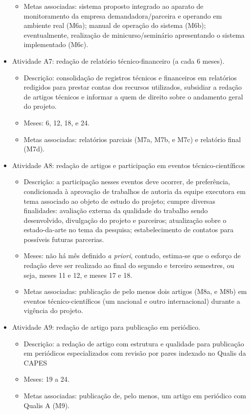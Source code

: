 \begin{itemize}
\begin{itemize}
		\item Metas associadas: sistema proposto integrado ao aparato de monitoramento da empresa demandadora/parceira e operando em ambiente real (M6a); manual de operação do sistema (M6b); eventualmente, realização de minicurso/seminário apresentando o sistema implementado (M6c).
	\end{itemize}
	\item Atividade A7: redação de relatório técnico-financeiro (a cada 6 meses).
	\begin{itemize}
		\item Descrição: consolidação de registros técnicos e financeiros em relatórios redigidos para prestar contas dos recursos utilizados, subsidiar a redação de artigos técnicos e informar a quem de direito sobre o andamento geral do projeto.
		\item Meses: 6, 12, 18, e 24.
		\item Metas associadas: relatórios parciais (M7a, M7b, e M7c) e relatório final (M7d).
	\end{itemize}
	\item  Atividade A8: redação de artigos e participação em eventos técnico-científicos
	\begin{itemize}
		\item Descrição: a participação nesses eventos deve ocorrer, de preferência, condicionada à aprovação de trabalhos de autoria da equipe executora em tema associado ao objeto de estudo do projeto; cumpre diversas finalidades: avaliação externa da qualidade do trabalho sendo desenvolvido, divulgação do projeto e parceiros; atualização sobre o estado-da-arte no tema da pesquisa; estabelecimento de contatos para possíveis futuras parcerias.
		\item Meses: não há mês definido \emph{a priori}, contudo, estima-se que o esforço de redação deve ser realizado ao final do segundo e terceiro semestres, ou seja, meses 11 e 12, e meses 17 e 18.
		\item Metas associadas: publicação de pelo menos dois artigos (M8a, e M8b) em eventos técnico-científicos (um nacional e outro internacional) durante a vigência do projeto.
	\end{itemize}
	\item Atividade A9: redação de artigo para publicação em periódico.
	\begin{itemize}
		\item Descrição: a redação de artigo com estrutura e qualidade para publicação em periódicos especializados com revisão por pares indexado no Qualis da CAPES
		\item Meses: 19 a 24.
		\item Metas associadas: publicação de, pelo menos, um artigo em periódico com Qualis A (M9).
	\end{itemize}
\end{itemize}

